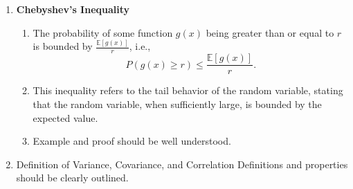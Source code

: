 \documentclass{article}
\begin{document}
\begin{enumerate}
    \item \textbf{Chebyshev's Inequality}
    \begin{enumerate}
        \item The probability of some function \(g(x)\) being greater than or equal to \(r\) is bounded by \( \frac{\mathbb{E}[g(x)]}{r} \), i.e., 
        \[
        P(g(x) \geq r) \leq \frac{\mathbb{E}[g(x)]}{r}.
        \]
        \item This inequality refers to the tail behavior of the random variable, stating that the random variable, when sufficiently large, is bounded by the expected value.
        \item Example and proof should be well understood.
    \end{enumerate}

    \item {Definition of Variance, Covariance, and Correlation}
Definitions and properties should be clearly outlined.
\end{enumerate}
\end{document}
